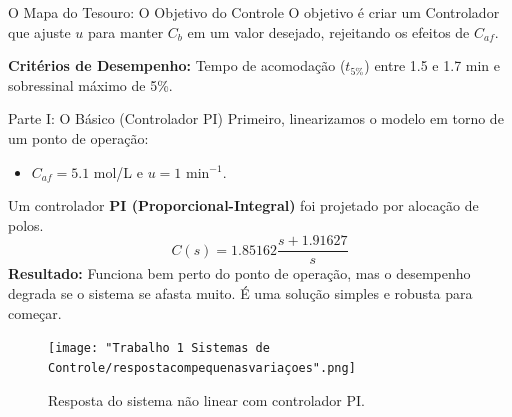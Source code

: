 \documentclass{beamer}
\begin{document}
\begin{frame}{O Mapa do Tesouro: O Objetivo do Controle}
    \Large O objetivo é criar um \alert{Controlador} que ajuste \(u\) para manter \(C_b\) em um valor desejado, rejeitando os efeitos de \(C_{af}\).
    
    \vspace{1em}
    
    
    \vspace{1em}
    \large \textbf{Critérios de Desempenho:} Tempo de acomodação (\(t_{5\%}\)) entre 1.5 e 1.7 min e sobressinal máximo de 5\%.
\end{frame}

\begin{frame}{Parte I: O Básico (Controlador PI)}
    \large Primeiro, linearizamos o modelo em torno de um ponto de operação:
    \begin{itemize}
        \item \( C_{af} = 5.1 \) mol/L e \( u = 1 \) min\(^{-1}\).
    \end{itemize}
    \vspace{1em}
    Um controlador \textbf{PI (Proporcional-Integral)} foi projetado por alocação de polos.
    \[ C(s) = 1.85162 \frac{s + 1.91627}{s} \]
    \vspace{1em}
    \textbf{Resultado:} Funciona bem perto do ponto de operação, mas o desempenho degrada se o sistema se afasta muito. É uma solução simples e robusta para começar.
    
    \begin{figure}
        \texttt{[image: "Trabalho 1 Sistemas de Controle/respostacompequenasvariaçoes".png]}
        \caption{Resposta do sistema não linear com controlador PI.}
    \end{figure}
\end{frame}
\end{document}
